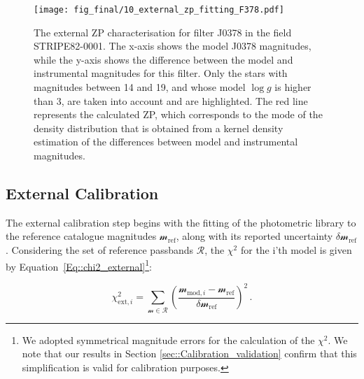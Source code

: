 \documentclass[fleqn,usenatbib]{mnras}
\begin{document}
\begin{figure}
\begin{center}
\texttt{[image: fig\_final/10\_external\_zp\_fitting\_F378.pdf]}
\caption{The external ZP characterisation for filter J0378 in the field STRIPE82-0001. The x-axis shows the model J0378 magnitudes, while the y-axis shows the difference between the model and instrumental magnitudes for this filter. Only the stars with magnitudes between 14 and 19, and whose model $\log g$ is higher than 3, are taken into account and are highlighted. The red line represents the calculated ZP, which corresponds to the mode of the density distribution that is obtained from a kernel density estimation of the differences between model and instrumental magnitudes.}
\label{fig::external_zp_fitting_example}
\end{center}
\end{figure}

\subsection{External Calibration}

The external calibration step begins with the fitting of the photometric library to the reference catalogue magnitudes $\mathcal{m}_\mathrm{ref}$, along with its reported uncertainty $\delta\mathcal{m}_\mathrm{ref}$. Considering the set of reference passbands $\mathscr{R}$, the $\chi^2$ for the i'th model is given by Equation~\ref{Eq::chi2_external}\footnote{We adopted symmetrical magnitude errors for the calculation of the $\chi^2$. We note that our results in Section \ref{sec::Calibration_validation} confirm that this simplification is valid for calibration purposes.}:

\begin{equation}
 \chi^2_{\mathrm{ext},i} = \sum_{\mathcal{m} \in \mathscr{R}} \left( \frac{ \mathcal{m}_{\mathrm{mod},i} - \mathcal{m}_{\mathrm{ref}} } {\delta \mathcal{m}_\mathrm{ref}} \right)^2 \,.
 \label{Eq::chi2_external}
\end{equation}
\end{document}
